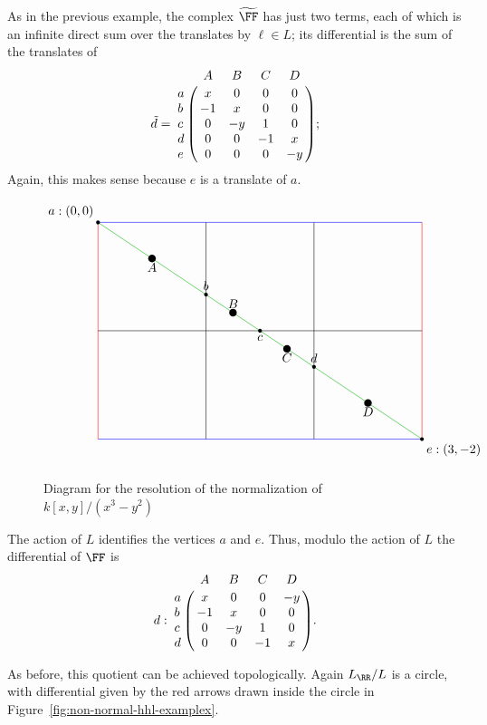 \documentclass{amsart}
\begin{document}
\begin{example} 
As in the previous example, the complex $\tF$
has just two terms, each of which is an infinite direct sum over the translates by $\ell \in L$; its differential is the sum of the translates of
$$
\tilde d = \bordermatrix{
     &A&B&C&D\cr
    a&x&0&0&0\cr
    b&-1&x&0&0\cr
    c&0&-y&1&0\cr
    d&0&0&-1&x\cr
    e&0&0&0&-y
};
$$
\noindent Again, this makes sense because $e$ is a translate of $a$.

\begin{figure}[h]
\caption{Diagram for the resolution of the normalization of $k[x,y]/(x^3-y^2)$}
\label{fig:cuspidal cubic 1}
$$
\begin{tikzpicture}[scale=3]
  \draw (1, 0) -- (1, -2);
  \draw (2, 0) -- (2, -2);

  \draw[blue] (0,  0) -- (3,  0);
  \draw[blue] (0, -2) -- (3, -2);

  \draw[red] (0,  0) -- (0, -2);
  \draw[red] (3,  0) -- (3, -2);
  \draw (0, -1) -- (3, -1);

  \draw[green!70!black] (0,0) -- (3,-2);

  \fill (0,0)    circle (.5pt) node[above left]  {$a:(0,0)$};
  \fill (1,-2/3) circle (.5pt) node[above]        {$b$};
  \fill (3/2,-1) circle (.5pt) node[below]        {$c$};
  \fill (2,-4/3) circle (.5pt) node[above]        {$d$};
  \fill (3,-2)   circle (.5pt) node[below right]  {$e:(3,-2)$};

  \fill (1/2,-1/3)   circle (1pt) node[below]  {$A$};
  \fill (5/4,-5/6)   circle (1pt) node[above]  {$B$};
  \fill (7/4,-7/6)   circle (1pt) node[below]  {$C$};
  \fill (5/2,-5/3)   circle (1pt) node[below]  {$D$};
\end{tikzpicture}
$$
\end{figure}

The action of $L$ identifies the vertices $a$ and $e$. Thus, modulo the action of $L$ the  differential
of $\FF$ is
$$d: 
\bordermatrix{
     &A&B&C&D\cr
    a&x&0&0&-y\cr
    b&-1&x&0&0\cr
    c&0&-y&1&0\cr
    d&0&0&-1&x\cr    
}.
$$

As before, this quotient can be achieved topologically. Again $L_{\RR}/L$ is a circle, with differential
given by the red arrows drawn inside the circle in
Figure~\ref{fig:non-normal-hhl-examplex}. 
 

\end{example}
\end{document}
